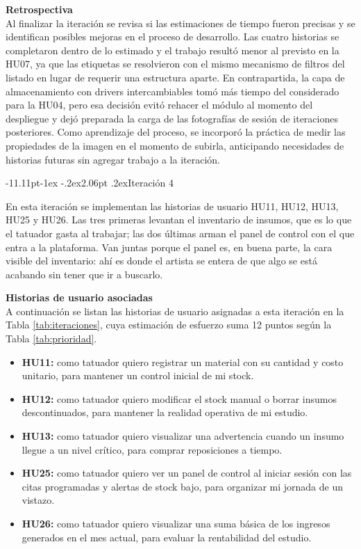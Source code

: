 \documentclass[12pt,letterpaper,oneside]{report}
\makeatletter
\renewcommand\subsection{\@startsection{subsection}{2}{\z@}%
  {-11.11pt\@plus -1ex \@minus -.2ex}{2.06pt \@plus .2ex}{\normalfont\normalsize\bfseries}}
\newcommand{\tituloparpegado}[1]{\par\textbf{#1}\\\indent\ignorespaces}
\makeatother
\begin{document}
\vspace{\parskip}
\tituloparpegado{Retrospectiva}
Al finalizar la iteración se revisa si las estimaciones de tiempo fueron precisas y se identifican posibles mejoras en el proceso de desarrollo. Las cuatro historias se completaron dentro de lo estimado y el trabajo resultó menor al previsto en la HU07, ya que las etiquetas se resolvieron con el mismo mecanismo de filtros del listado en lugar de requerir una estructura aparte. En contrapartida, la capa de almacenamiento con drivers intercambiables tomó más tiempo del considerado para la HU04, pero esa decisión evitó rehacer el módulo al momento del despliegue y dejó preparada la carga de las fotografías de sesión de iteraciones posteriores. Como aprendizaje del proceso, se incorporó la práctica de medir las propiedades de la imagen en el momento de subirla, anticipando necesidades de historias futuras sin agregar trabajo a la iteración.

\subsection{Iteración 4}

En esta iteración se implementan las historias de usuario HU11, HU12, HU13, HU25 y HU26. Las tres primeras levantan el inventario de insumos, que es lo que el tatuador gasta al trabajar; las dos últimas arman el panel de control con el que entra a la plataforma. Van juntas porque el panel es, en buena parte, la cara visible del inventario: ahí es donde el artista se entera de que algo se está acabando sin tener que ir a buscarlo.

\vspace{0.3cm}
\tituloparpegado{Historias de usuario asociadas}
A continuación se listan las historias de usuario asignadas a esta iteración en la Tabla \ref{tab:iteraciones}, cuya estimación de esfuerzo suma 12 puntos según la Tabla \ref{tab:prioridad}.

\begin{itemize}
  \item \textbf{HU11:} como tatuador quiero registrar un material con su cantidad y costo unitario, para mantener un control inicial de mi stock.
  \item \textbf{HU12:} como tatuador quiero modificar el stock manual o borrar insumos descontinuados, para mantener la realidad operativa de mi estudio.
  \item \textbf{HU13:} como tatuador quiero visualizar una advertencia cuando un insumo llegue a un nivel crítico, para comprar reposiciones a tiempo.
  \item \textbf{HU25:} como tatuador quiero ver un panel de control al iniciar sesión con las citas programadas y alertas de stock bajo, para organizar mi jornada de un vistazo.
  \item \textbf{HU26:} como tatuador quiero visualizar una suma básica de los ingresos generados en el mes actual, para evaluar la rentabilidad del estudio.
\end{itemize}
\end{document}
